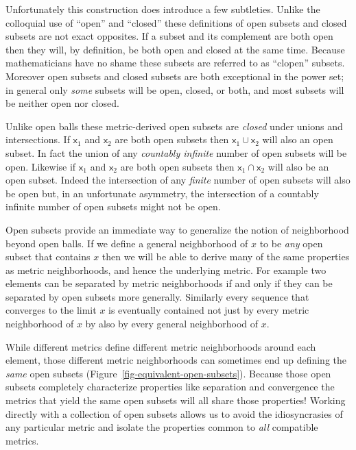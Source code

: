 \documentclass[
  letterpaper,
  DIV=11,
  numbers=noendperiod]{scrartcl}
\begin{document}
Unfortunately this construction does introduce a few subtleties. Unlike
the colloquial use of ``open'' and ``closed'' these definitions of open
subsets and closed subsets are not exact opposites. If a subset and its
complement are both open then they will, by definition, be both open and
closed at the same time. Because mathematicians have no shame these
subsets are referred to as ``clopen'' subsets. Moreover open subsets and
closed subsets are both exceptional in the power set; in general only
\emph{some} subsets will be open, closed, or both, and most subsets will
be neither open nor closed.

Unlike open balls these metric-derived open subsets are \emph{closed}
under unions and intersections. If \(\mathsf{x}_{1}\) and
\(\mathsf{x}_{2}\) are both open subsets then
\(\mathsf{x}_{1} \cup \mathsf{x}_{2}\) will also an open subset. In fact
the union of any \emph{countably infinite} number of open subsets will
be open. Likewise if \(\mathsf{x}_{1}\) and \(\mathsf{x}_{2}\) are both
open subsets then \(\mathsf{x}_{1} \cap \mathsf{x}_{2}\) will also be an
open subset. Indeed the intersection of any \emph{finite} number of open
subsets will also be open but, in an unfortunate asymmetry, the
intersection of a countably infinite number of open subsets might not be
open.

Open subsets provide an immediate way to generalize the notion of
neighborhood beyond open balls. If we define a general neighborhood of
\(x\) to be \emph{any} open subset that contains \(x\) then we will be
able to derive many of the same properties as metric neighborhoods, and
hence the underlying metric. For example two elements can be separated
by metric neighborhoods if and only if they can be separated by open
subsets more generally. Similarly every sequence that converges to the
limit \(x\) is eventually contained not just by every metric
neighborhood of \(x\) by also by every general neighborhood of \(x\).

While different metrics define different metric neighborhoods around
each element, those different metric neighborhoods can sometimes end up
defining the \emph{same} open subsets
(Figure~\ref{fig-equivalent-open-subsets}). Because those open subsets
completely characterize properties like separation and convergence the
metrics that yield the same open subsets will all share those
properties! Working directly with a collection of open subsets allows us
to avoid the idiosyncrasies of any particular metric and isolate the
properties common to \emph{all} compatible metrics.
\end{document}
